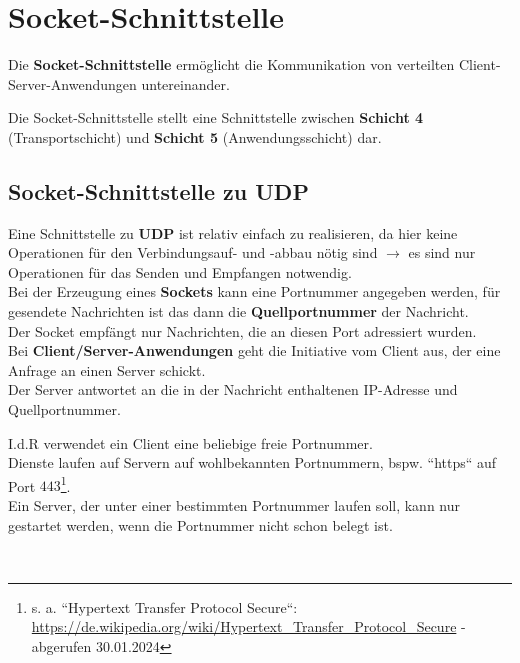 \section{Socket-Schnittstelle}

Die \textbf{Socket-Schnittstelle} ermöglicht die Kommunikation von verteilten Client-Server-Anwendungen untereinander.

\begin{tcolorbox}[enlarge top by=0.5cm,enlarge bottom by=0.5cm]
Die Socket-Schnittstelle stellt eine Schnittstelle zwischen \textbf{Schicht 4} (Transportschicht) und \textbf{Schicht 5} (Anwendungsschicht) dar.
\end{tcolorbox}

\subsection{Socket-Schnittstelle zu UDP}

Eine Schnittstelle zu \textbf{UDP} ist relativ einfach zu realisieren, da hier keine Operationen für den Verbindungsauf- und -abbau nötig sind $\rightarrow$ es sind nur Operationen für das Senden und Empfangen notwendig.\\

\noindent
Bei der Erzeugung eines \textbf{Sockets} kann eine Portnummer angegeben werden, für gesendete Nachrichten ist das dann die \textbf{Quellportnummer} der Nachricht.\\
Der Socket empfängt nur Nachrichten, die an diesen Port adressiert wurden.\\

\noindent
Bei \textbf{Client/Server-Anwendungen} geht die Initiative vom Client aus, der eine Anfrage an einen Server schickt.\\
Der Server antwortet an die in der Nachricht enthaltenen IP-Adresse und Quellportnummer.

\begin{tcolorbox}[enlarge top by=0.5cm,enlarge bottom by=0.5cm]
I.d.R verwendet ein Client eine beliebige freie Portnummer.\\

\noindent
Dienste laufen auf Servern auf wohlbekannten Portnummern, bspw. ``https`` auf Port $443$\footnote{
s. a. ``Hypertext Transfer Protocol Secure``: \url{https://de.wikipedia.org/wiki/Hypertext_Transfer_Protocol_Secure} - abgerufen 30.01.2024
}.\\
Ein Server, der unter einer bestimmten Portnummer laufen soll, kann nur gestartet werden, wenn die Portnummer nicht schon belegt ist.
\end{tcolorbox}\\

